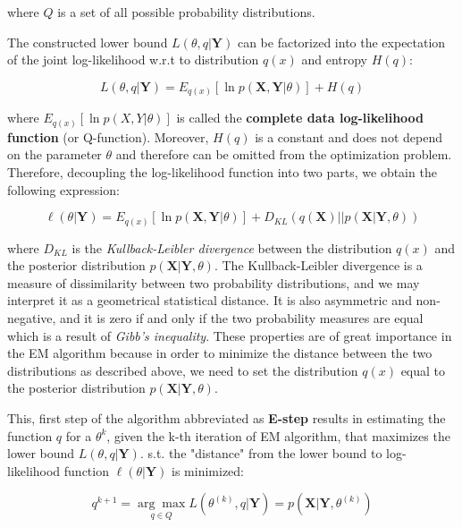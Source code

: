 where $Q$ is a set of all possible probability distributions.

The constructed lower bound $L(\theta,q|\textbf{Y})$ can be factorized into the expectation 
of the joint log-likelihood w.r.t to distribution $q(x)$ and entropy $H(q)$:

\begin{equation}
    L(\theta,q|\textbf{Y}) = E_{q(x)} [\ln p(\textbf{X},\textbf{Y}|\theta)] + H(q)
\end{equation}

where $E_{q(x)} [\ln p(X,Y|\theta)]$ is called the \textbf{complete data log-likelihood function} (or Q-function).
Moreover, $H(q)$ is a constant and does not depend on the parameter $\theta$ and therefore can be omitted from the
optimization problem. Therefore, decoupling the log-likelihood function into two parts, we obtain the following expression:

\begin{equation}
    \ell(\theta|\textbf{Y}) = E_{q(x)} [\ln p(\textbf{X},\textbf{Y}|\theta)] + D_{KL} (q(\textbf{X}) || p(\textbf{X}| \textbf{Y},\theta))
\end{equation}

where $D_{KL}$ is the \textit{Kullback-Leibler divergence} between the distribution $q(x)$ and the posterior distribution $p(\textbf{X}|\textbf{Y},\theta)$.
The Kullback-Leibler divergence is a measure of dissimilarity between two probability distributions, and we may interpret it as a geometrical statistical distance.
It is also asymmetric and non-negative, and it is zero if and only if the two probability measures are equal which is a result of \textit{Gibb's inequality}.
These properties are of great importance in the EM algorithm because in order to minimize the distance between the two distributions as described above,
we need to set the distribution $q(x)$ equal to the posterior distribution $p(\textbf{X}|\textbf{Y},\theta)$.

This, first step of the algorithm abbreviated as \textbf{E-step} results in estimating the function $q$ for a $\theta^{k}$, given the k-th iteration of EM algorithm, 
that maximizes the lower bound $L(\theta,q|\textbf{Y})$. s.t. the "distance" from the lower bound to log-likelihood function $\ell(\theta|\textbf{Y})$ is minimized:

\begin{equation}
    q^{k+1} = \underset{q \in Q}{\arg\max} L(\theta^{(k)},q|\textbf{Y}) = p(\textbf{X}|\textbf{Y},\theta^{(k)})
\end{equation}


